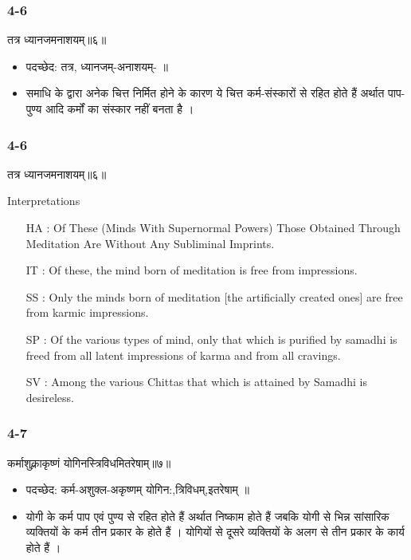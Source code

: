 \begin{frame}[fragile]\frametitle{4-6}
\begin{sanskrit}
तत्र ध्यानजमनाशयम्॥६॥
\end{sanskrit}

\begin{itemize}
\item पदच्छेद:  तत्र, ध्यानजम्-अनाशयम्- ॥
\item समाधि के द्वारा अनेक चित्त निर्मित होने के कारण ये चित्त कर्म-संस्कारों से रहित होते हैं अर्थात पाप-पुण्य आदि कर्मों का संस्कार नहीं बनता है ।
\end{itemize}
\end{frame}


\begin{frame}[fragile]\frametitle{4-6}
\begin{sanskrit}
तत्र ध्यानजमनाशयम्॥६॥
\end{sanskrit}

Interpretations
\begin{itemize}	
\item [HA]: Of These (Minds With Supernormal Powers) Those Obtained Through Meditation Are Without Any Subliminal Imprints.
\item [IT]: Of these, the mind born of meditation is free from impressions.
\item [SS]: Only the minds born of meditation [the artificially created ones] are free from karmic impressions.
\item [SP]: Of the various types of mind, only that which is purified by samadhi is freed from all latent impressions of karma and from all cravings.
\item [SV]: Among the various Chittas that which is attained by Samadhi is desireless. 
\end{itemize}
\end{frame}


\begin{frame}[fragile]\frametitle{4-7}
\begin{sanskrit}
कर्माशुक्लाकृष्णं योगिनस्त्रिविधमितरेषाम्॥७॥
\end{sanskrit}

\begin{itemize}
\item पदच्छेद:  कर्म-अशुक्ल-अकृष्णम् योगिन:,त्रिविधम्,इतरेषाम् ॥
\item योगी के कर्म पाप एवं पुण्य से रहित होते हैं अर्थात निष्काम होते हैं जबकि योगी से भिन्न सांसारिक व्यक्तियों के कर्म तीन प्रकार के होते हैं । योगियों से दूसरे व्यक्तियों के अलग से तीन प्रकार के कार्य होते हैं ।
\end{itemize}
\end{frame}


